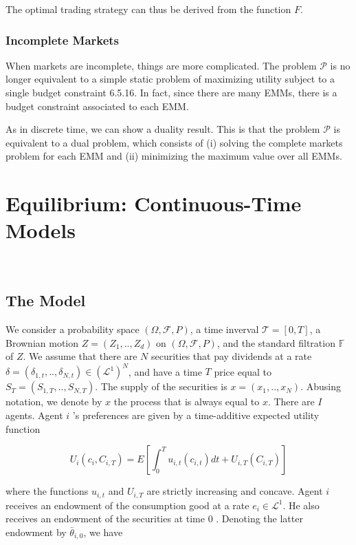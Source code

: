 \documentclass[\topdir/lecture\_notes.tex]{subfiles}
\begin{document}
The optimal trading strategy can thus be derived from the function $F$.




\subsubsection{Incomplete Markets}
When markets are incomplete, things are more complicated. The problem $\mathcal{P}$ is no longer equivalent to a simple static problem of maximizing utility subject to a single budget constraint 6.5.16. In fact, since there are many EMMs, there is a budget constraint associated to each EMM.

As in discrete time, we can show a duality result. This is that the problem $\mathcal{P}$ is equivalent to a dual problem, which consists of (i) solving the complete markets problem for each EMM and (ii) minimizing the maximum value over all EMMs.


\section{Equilibrium: Continuous-Time Models}
\

\subsection{The Model}
We consider a probability space $(\Omega, \mathcal{F}, P)$, a time inverval $\mathcal{T}=[0, T]$, a Brownian motion $Z=\left(Z_{1}, . ., Z_{d}\right)$ on $(\Omega, \mathcal{F}, P)$, and the standard filtration $\mathbb{F}$ of $Z$. We assume that there are $N$ securities that pay dividends at a rate $\delta=\left(\delta_{1, t}, . ., \delta_{N, t}\right) \in\left(\mathcal{L}^{1}\right)^{N}$, and have a time $T$ price equal to $S_{T}=\left(S_{1, T}, . ., S_{N, T}\right)$. The supply of the securities is $x=\left(x_{1}, . ., x_{N}\right)$. Abusing notation, we denote by $x$ the process that is always equal to $x$. There are $I$ agents. Agent $i$ 's preferences are given by a time-additive expected utility function

\begin{equation}
U_{i}\left(c_{i}, C_{i, T}\right)=E\left[\int_{0}^{T} u_{i, t}\left(c_{i, t}\right) d t+U_{i, T}\left(C_{i, T}\right)\right]
\end{equation}

where the functions $u_{i, t}$ and $U_{i, T}$ are strictly increasing and concave. Agent $i$ receives an endowment of the consumption good at a rate $e_{i} \in \mathcal{L}^{1}$. He also receives an endowment of the securities at time 0 . Denoting the latter endowment by $\bar{\theta}_{i, 0}$, we have
\end{document}
